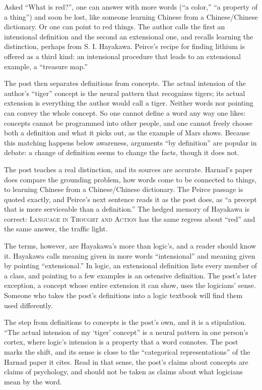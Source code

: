 \begin{afterword}
\summaryhead

Asked ``What is red?'', one can answer with more words (``a color,'' ``a property of a thing'') and soon be lost, like someone learning Chinese from a Chinese/Chinese dictionary. Or one can point to red things. The author calls the first an intensional definition and the second an extensional one, and recalls learning the distinction, perhaps from S. I. Hayakawa. Peirce's recipe for finding lithium is offered as a third kind: an intensional procedure that leads to an extensional example, a ``treasure map.''

The post then separates definitions from concepts. The actual intension of the author's ``tiger'' concept is the neural pattern that recognizes tigers; its actual extension is everything the author would call a tiger. Neither words nor pointing can convey the whole concept. So one cannot define a word any way one likes: concepts cannot be programmed into other people, and one cannot freely choose both a definition and what it picks out, as the example of Mars shows. Because this matching happens below awareness, arguments ``by definition'' are popular in debate: a change of definition seems to change the facts, though it does not.

\responsehead

The post teaches a real distinction, and its sources are accurate. Harnad's paper does compare the grounding problem, how words come to be connected to things, to learning Chinese from a Chinese/Chinese dictionary. The Peirce passage is quoted exactly, and Peirce's next sentence reads it as the post does, as ``a precept that is more serviceable than a definition.'' The hedged memory of Hayakawa is correct: \textsc{Language in Thought and Action} has the same regress about ``red'' and the same answer, the traffic light.

The terms, however, are Hayakawa's more than logic's, and a reader should know it. Hayakawa calls meaning given in more words ``intensional'' and meaning given by pointing ``extensional.'' In logic, an extensional definition lists every member of a class, and pointing to a few examples is an ostensive definition. The post's later exception, a concept whose entire extension it can show, uses the logicians' sense. Someone who takes the post's definitions into a logic textbook will find them used differently.

The step from definitions to concepts is the post's own, and it is a stipulation. ``The actual intension of my `tiger' concept'' is a neural pattern in one person's cortex, where logic's intension is a property that a word connotes. The post marks the shift, and its sense is close to the ``categorical representations'' of the Harnad paper it cites. Read in that sense, the post's claims about concepts are claims of psychology, and should not be taken as claims about what logicians mean by the word.


\end{afterword}
